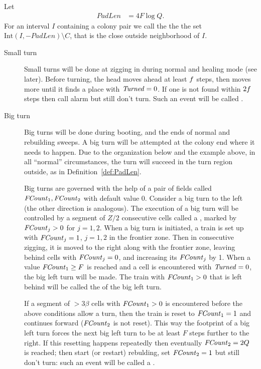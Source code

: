 \documentclass[11pt]{memoir}
\theoremstyle{definition} %
\renewcommand{\ge}{\geq}
\newcommand{\fld}[1]{\ensuremath{\textit{#1\/}}}
\newcommand{\F}{F}
\newcommand{\Int}{\mathrm{Int}} %
\newcommand{\Q}{Q} %
\newcommand{\Z}{Z} %
\newcommand{\PadLen}{\mathit{PadLen}} %
\newcommand{\Turned}{\fld{Turned}} %
\newcommand{\FCount}{\fld{FCount}} %
\begin{document}
\begin{definition}\label{def:PadLen}
Let 
\begin{align}\label{eq:PadLen}
  \PadLen &= 4\F\log\Q.   
\end{align}
For an interval \( I \) containing a colony pair we call the 
the  the set \( \Int(I,-\PadLen)\setminus C \), that is the close
outside neighborhood of \( I \).
\end{definition}



\begin{description}
\item[Small turn]
  Small turns will be done at zigging in during normal and healing mode (see later).
  Before turning, the head moves ahead at least \( f \) steps, then moves more until it finds a
  place with \( \Turned=0 \).
  If one is not found within \( 2f \) steps then call alarm but still don't turn.
  Such an event will be called .

\item[Big turn]
  Big turns will be done during booting, and the ends of normal and rebuilding sweeps.
  A big turn will be attempted at the colony end where it needs to happen.
Due to the organization below and the example above, in all ``normal'' circumstances,
the turn will succeed in the turn region outside, as in Definition~\ref{def:PadLen}.

Big turns are governed with the help of a pair of fields
called \( \FCount_{1},\FCount_{2} \) with default value 0.
Consider a big turn to the left (the other direction is analogous).
The execution of a big turn will be controlled by a segment of \( \Z/2 \) consecutive cells
called a , marked by \( \FCount_{j}>0 \) for \( j=1,2 \).
When a big turn is initiated, a train is set up with \( \FCount_{j}= 1 \), \( j=1,2 \) in the frontier zone.
Then in consecutive zigging, it is moved to the right along with the frontier zone,
leaving behind cells with \( \FCount_{j}=0 \), and increasing its \( \FCount_{j} \) by 1.
When a value \( \FCount_{1}\ge\F \) is reached and a cell is encountered with \( \Turned=0 \),
the big left turn will be made.
The train with \( \FCount_{1}>0 \) that is left behind will be called the  of the big left turn.

If a segment of \( >3\beta \) cells with \( \FCount_{1}>0 \)
is encountered before the above conditions allow a turn,
then the train is reset to \( \FCount_{1}= 1 \) and continues forward (\( \FCount_{2} \) is not reset).
This way the footprint of a big left turn forces the next big left turn to be at least \( \F \) steps
further to the right.
If this resetting happens repeatedly then eventually 
\( \FCount_{2}=2\Q \) is reached; then start (or restart) rebulding,
set \( \FCount_{2}=1 \) but still don't turn: such an event will be called a .
\end{description}
\end{document}
